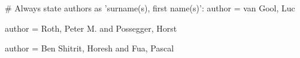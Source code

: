 # Always state authors as 'surname(s), first name(s)':
author = {van Gool, Luc}

author = {Roth, Peter M. and Possegger, Horst}

author = {Ben Shitrit, Horesh and Fua, Pascal}
